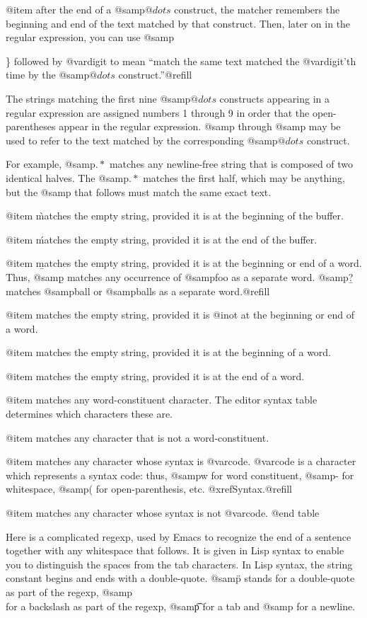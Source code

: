 {{{{{{{{{{{{{@item 
after the end of a @samp{\( @dots{} \)} construct, the matcher remembers the
beginning and end of the text matched by that construct.  Then, later on
in the regular expression, you can use @samp{\} followed by @var{digit}
to mean ``match the same text matched the @var{digit}'th time by the
@samp{\( @dots{} \)} construct.''@refill

The strings matching the first nine @samp{\( @dots{} \)} constructs appearing
in a regular expression are assigned numbers 1 through 9 in order that the
open-parentheses appear in the regular expression.  @samp{\1} through
@samp{\9} may be used to refer to the text matched by the corresponding
@samp{\( @dots{} \)} construct.

For example, @samp{\(.*\)\1} matches any newline-free string that is
composed of two identical halves.  The @samp{\(.*\)} matches the first
half, which may be anything, but the @samp{\1} that follows must match
the same exact text.

@item \`
matches the empty string, provided it is at the beginning
of the buffer.

@item \'
matches the empty string, provided it is at the end of
the buffer.

@item \b
matches the empty string, provided it is at the beginning or
end of a word.  Thus, @samp{\bfoo\b} matches any occurrence of
@samp{foo} as a separate word.  @samp{\bballs?\b} matches
@samp{ball} or @samp{balls} as a separate word.@refill

@item \B
matches the empty string, provided it is @i{not} at the beginning or
end of a word.

@item \<
matches the empty string, provided it is at the beginning of a word.

@item \>
matches the empty string, provided it is at the end of a word.

@item \w
matches any word-constituent character.  The editor syntax table
determines which characters these are.

@item \W
matches any character that is not a word-constituent.

@item 
matches any character whose syntax is @var{code}.  @var{code} is a
character which represents a syntax code: thus, @samp{w} for word
constituent, @samp{-} for whitespace, @samp{(} for open-parenthesis,
etc.  @xref{Syntax}.@refill

@item 
matches any character whose syntax is not @var{code}.
@end table

  Here is a complicated regexp, used by Emacs to recognize the end of a
sentence together with any whitespace that follows.  It is given in Lisp
syntax to enable you to distinguish the spaces from the tab characters.  In
Lisp syntax, the string constant begins and ends with a double-quote.
@samp{\"} stands for a double-quote as part of the regexp, @samp{\\} for a
backslash as part of the regexp, @samp{\t} for a tab and @samp{\n} for a
newline.

}}}}}}}}}}}}}}
